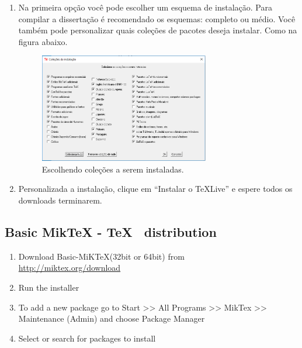 \begin{enumerate}
\begin{enumerate}
              \item Na primeira opção você pode escolher um esquema de instalação. Para compilar a dissertação é recomendado os esquemas: completo ou médio. Você também pode personalizar quais coleções de pacotes deseja instalar. Como na figura abaixo.
              \begin{figure}[htbp!]
                \centering
                \includegraphics[width=0.7\textwidth]{install-tl-02}
                \caption[Instação Personalizaa]{Escolhendo coleções a serem instaladas.}
                \label{fig:install-tl-02}
            \end{figure}

            \item Personalizada a instalação, clique em ``Instalar o TeXLive'' e espere todos os downloads terminarem.
	      \end{enumerate}
\end{enumerate}


\subsection*{Basic MikTeX - \TeX~ distribution}
\begin{enumerate}
	\item	Download Basic-MiK\TeX (32bit or 64bit) from\\
	      \href{http://miktex.org/download}{http://miktex.org/download}
	\item	Run the installer
	\item	To add a new package go to Start >> All Programs >> MikTex >> Maintenance (Admin) and choose Package Manager
	\item	Select or search for packages to install
\end{enumerate}

